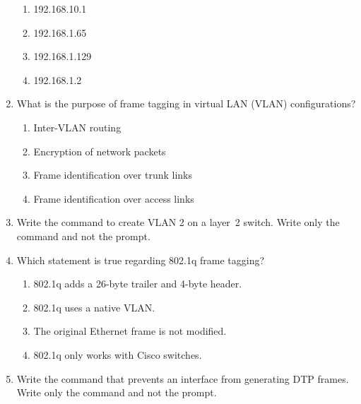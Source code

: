 \begin{enumerate}
  \begin{figure}
  \centering
  \caption{}
  \end{figure}

  \begin{enumerate}
    \item
    192.168.10.1
  \item
    192.168.1.65
  \item
    192.168.1.129
  \item
    192.168.1.2
  \end{enumerate}
\item
   What is the
  purpose of frame tagging in virtual LAN (VLAN) configurations?

  \begin{enumerate}
    \item
    Inter-VLAN routing
  \item
    Encryption of network packets
  \item
    Frame identification over trunk links
  \item
    Frame identification over access links
  \end{enumerate}
\item
  Write the command to create VLAN 2 on a layer~2 switch. Write only the
  command and not the prompt.
\item
  Which statement is true regarding 802.1q frame tagging?

  \begin{enumerate}
    \item
    802.1q adds a 26-byte trailer and 4-byte header.
  \item
    802.1q uses a native VLAN.
  \item
    The original Ethernet frame is not modified.
  \item
    802.1q only works with Cisco switches.
  \end{enumerate}
\item
  Write the command that prevents an interface from generating DTP
  frames. Write only the command and not the prompt.
\end{enumerate}



